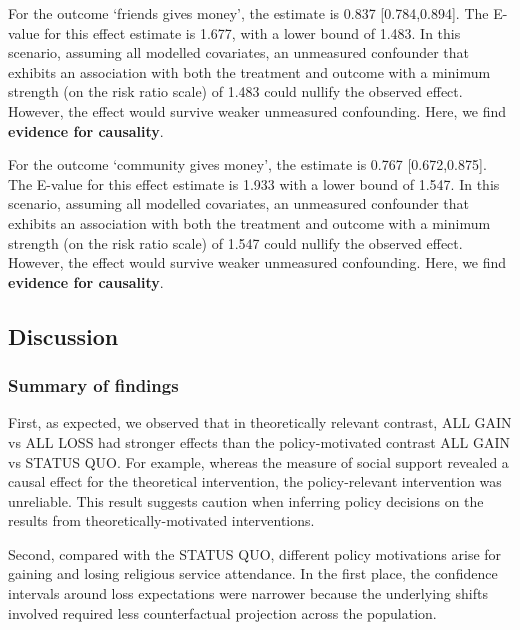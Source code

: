 \documentclass[
  single column]{article}
\begin{document}
For the outcome `friends gives money', the estimate is 0.837
{[}0.784,0.894{]}. The E-value for this effect estimate is 1.677, with a
lower bound of 1.483. In this scenario, assuming all modelled
covariates, an unmeasured confounder that exhibits an association with
both the treatment and outcome with a minimum strength (on the risk
ratio scale) of 1.483 could nullify the observed effect. However, the
effect would survive weaker unmeasured confounding. Here, we find
\textbf{evidence for causality}.

For the outcome `community gives money', the estimate is 0.767
{[}0.672,0.875{]}. The E-value for this effect estimate is 1.933 with a
lower bound of 1.547. In this scenario, assuming all modelled
covariates, an unmeasured confounder that exhibits an association with
both the treatment and outcome with a minimum strength (on the risk
ratio scale) of 1.547 could nullify the observed effect. However, the
effect would survive weaker unmeasured confounding. Here, we find
\textbf{evidence for causality}.

\subsection{Discussion}\label{discussion}

\subsubsection{Summary of findings}\label{summary-of-findings}

First, as expected, we observed that in theoretically relevant contrast,
ALL GAIN vs ALL LOSS had stronger effects than the policy-motivated
contrast ALL GAIN vs STATUS QUO. For example, whereas the measure of
social support revealed a causal effect for the theoretical
intervention, the policy-relevant intervention was unreliable. This
result suggests caution when inferring policy decisions on the results
from theoretically-motivated interventions.

Second, compared with the STATUS QUO, different policy motivations arise
for gaining and losing religious service attendance. In the first place,
the confidence intervals around loss expectations were narrower because
the underlying shifts involved required less counterfactual projection
across the population.
\end{document}

